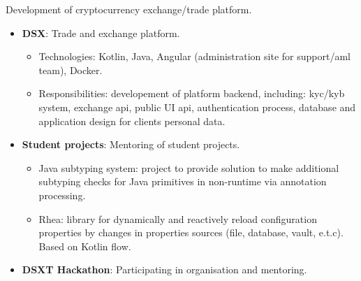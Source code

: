 \documentclass{cv}
\begin{document}
\begin{cvblock}{%
  }

  Development of cryptocurrency exchange/trade platform.

  \begin{itemize}
    \item \textbf{DSX}: Trade and exchange platform.
      \begin{itemize}
        \item Technologies: Kotlin, Java, Angular (administration site for support/aml team), Docker.
        \item Responsibilities: developement of platform backend, including:
          kyc/kyb system, exchange api, public UI api, authentication process,
          database and application design for clients personal data.
      \end{itemize}
    \item \textbf{Student projects}: Mentoring of student projects.
      \begin{itemize}
        \item Java subtyping system: project to provide solution to make additional
          subtyping checks for Java primitives in non-runtime via annotation processing.
        \item Rhea: library for dynamically and reactively reload configuration properties
          by changes in properties sources (file, database, vault, e.t.c). Based on
          Kotlin flow.
      \end{itemize}
    \item \textbf{DSXT Hackathon}: Participating in organisation and mentoring.
  \end{itemize}
\end{cvblock}

\vspace{2em}
\end{document}
